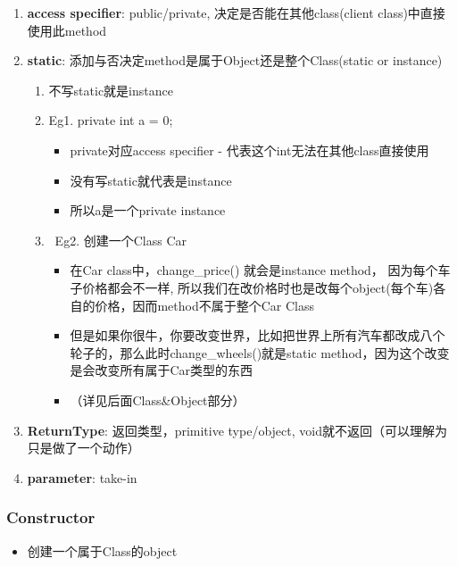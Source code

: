 \documentclass[
  paper=a4,
  ,captions=tableheading
]{scrartcl}
\providecommand{\tightlist}{%
  \setlength{\itemsep}{0pt}\setlength{\parskip}{0pt}}
\begin{document}
\begin{enumerate}
\def\labelenumi{\arabic{enumi}.}
\item
  \textbf{access specifier}: public/private,
  决定是否能在其他class(client class)中直接使用此method
\item
  \textbf{static}: 添加与否决定method是属于Object还是整个Class(static or
  instance)

  \begin{enumerate}
  \def\labelenumii{\arabic{enumii}.}
  \item
    不写static就是instance
  \item
    Eg1. private int a = 0;

    \begin{itemize}
    \item
      private对应access specifier - 代表这个int无法在其他class直接使用
    \item
      没有写static就代表是instance
    \item
      所以a是一个private instance
    \end{itemize}
  \item
    ~Eg2. 创建一个Class Car

    \begin{itemize}
    \item
      在Car class中，change\_price() 就会是instance method，
      因为每个车子价格都会不一样,
      所以我们在改价格时也是改每个object(每个车)各自的价格，因而method不属于整个Car
      Class
    \item
      但是如果你很牛，你要改变世界，比如把世界上所有汽车都改成八个轮子的，那么此时change\_wheels()就是static
      method，因为这个改变是会改变所有属于Car类型的东西
    \item
      （详见后面Class\&Object部分）
    \end{itemize}
  \end{enumerate}
\item
  \textbf{ReturnType}: 返回类型，primitive type/object,
  void就不返回（可以理解为只是做了一个动作）
\item
  \textbf{parameter}: take-in
\end{enumerate}

\hypertarget{constructor}{%
\subsubsection{Constructor}\label{constructor}}

\begin{itemize}
\tightlist
\item
  创建一个属于Class的object
\end{itemize}
\end{document}
